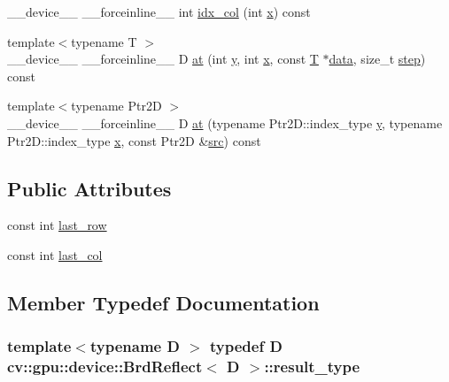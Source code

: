 \begin{DoxyCompactItemize}
\item 
\-\_\-\-\_\-device\-\_\-\-\_\- \-\_\-\-\_\-forceinline\-\_\-\-\_\- int \hyperlink{structcv_1_1gpu_1_1device_1_1BrdReflect_a55dfa7c9eeecf970fec5fe46eaba0c77}{idx\-\_\-col} (int \hyperlink{highgui__c_8h_a6150e0515f7202e2fb518f7206ed97dc}{x}) const 
\item 
{\footnotesize template$<$typename T $>$ }\\\-\_\-\-\_\-device\-\_\-\-\_\- \-\_\-\-\_\-forceinline\-\_\-\-\_\- D \hyperlink{structcv_1_1gpu_1_1device_1_1BrdReflect_a38d6ef40fa1fb4ed816fcaf7f8629d6e}{at} (int \hyperlink{highgui__c_8h_af1202c02b14870c18fb3a1da73e9e7c7}{y}, int \hyperlink{highgui__c_8h_a6150e0515f7202e2fb518f7206ed97dc}{x}, const \hyperlink{calib3d_8hpp_a3efb9551a871ddd0463079a808916717}{T} $\ast$\hyperlink{legacy_8hpp_ab9fe6c09e6d02865a953fffc12fe6ca0}{data}, size\-\_\-t \hyperlink{legacy_8hpp_abc16e65f240ed0c8f3e876e8732c0a33}{step}) const 
\item 
{\footnotesize template$<$typename Ptr2\-D $>$ }\\\-\_\-\-\_\-device\-\_\-\-\_\- \-\_\-\-\_\-forceinline\-\_\-\-\_\- D \hyperlink{structcv_1_1gpu_1_1device_1_1BrdReflect_a403588713fdb89cb23ae33b281d0cf30}{at} (typename Ptr2\-D\-::index\-\_\-type \hyperlink{highgui__c_8h_af1202c02b14870c18fb3a1da73e9e7c7}{y}, typename Ptr2\-D\-::index\-\_\-type \hyperlink{highgui__c_8h_a6150e0515f7202e2fb518f7206ed97dc}{x}, const Ptr2\-D \&\hyperlink{legacy_8hpp_a371cd109b74033bc4366f584edd3dacc}{src}) const 
\end{DoxyCompactItemize}
\subsection*{Public Attributes}
\begin{DoxyCompactItemize}
\item 
const int \hyperlink{structcv_1_1gpu_1_1device_1_1BrdReflect_aff56dc6cb266775d6b61c2751b2a7a55}{last\-\_\-row}
\item 
const int \hyperlink{structcv_1_1gpu_1_1device_1_1BrdReflect_a2bdcb0caecf6680f4aad41dff5a3da5b}{last\-\_\-col}
\end{DoxyCompactItemize}


\subsection{Member Typedef Documentation}
\hypertarget{structcv_1_1gpu_1_1device_1_1BrdReflect_afd6b976094e7137663c20b24ee6169cb}{
\subsubsection[{result\-\_\-type}]{\setlength{\rightskip}{0pt plus 5cm}template$<$typename D $>$ typedef D {\bf cv\-::gpu\-::device\-::\-Brd\-Reflect}$<$ D $>$\-::{\bf result\-\_\-type}}}\label{structcv_1_1gpu_1_1device_1_1BrdReflect_afd6b976094e7137663c20b24ee6169cb}


